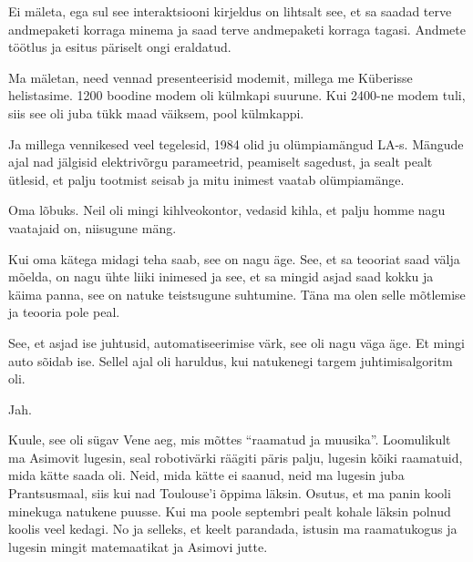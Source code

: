 Ei mäleta, ega sul see interaktsiooni kirjeldus on lihtsalt see, et sa saadad 
terve 
andmepaketi korraga minema ja saad terve andmepaketi korraga tagasi. Andmete  
töötlus ja esitus päriselt ongi eraldatud. 


Ma mäletan, need vennad  presenteerisid modemit, millega me  Küberisse 
helistasime. 1200 boodine modem oli külmkapi suurune. Kui 2400-ne modem 
tuli, siis see oli juba tükk maad väiksem, pool külmkappi.

Ja millega vennikesed veel tegelesid, 1984 olid ju olümpiamängud LA-s. Mängude 
ajal nad jälgisid elektrivõrgu parameetrid, peamiselt sagedust, ja sealt pealt 
ütlesid, et palju tootmist seisab ja mitu inimest vaatab olümpiamänge. 


Oma lõbuks. Neil oli mingi kihlveokontor, vedasid kihla, et palju homme nagu 
vaatajaid on, niisugune mäng.

                              
Kui oma kätega midagi teha saab, see on nagu äge. See, et sa teooriat saad 
välja mõelda, on nagu ühte liiki inimesed ja see, et sa mingid asjad saad kokku 
ja käima panna, see on natuke teistsugune suhtumine. Täna ma olen selle 
mõtlemise ja teooria pole peal.
                 
                 
See, et asjad ise juhtusid, automatiseerimise värk, see oli nagu väga äge. Et 
mingi auto sõidab ise. Sellel ajal oli haruldus, kui natukenegi targem 
juhtimisalgoritm oli.


Jah.


Kuule, see oli sügav Vene aeg, mis mõttes \enquote{raamatud ja muusika}. 
Loomulikult ma 
Asimovit lugesin, seal robotivärki räägiti päris palju, lugesin kõiki 
raamatuid, mida kätte saada oli. Neid, mida kätte ei saanud, neid ma lugesin 
juba Prantsusmaal, siis kui nad Toulouse'i  õppima läksin. Osutus, et ma panin  
kooli minekuga natukene puusse. Kui ma poole septembri pealt kohale läksin 
polnud koolis veel kedagi. No ja selleks, et keelt parandada,  
istusin ma raamatukogus ja lugesin mingit matemaatikat ja Asimovi jutte.

